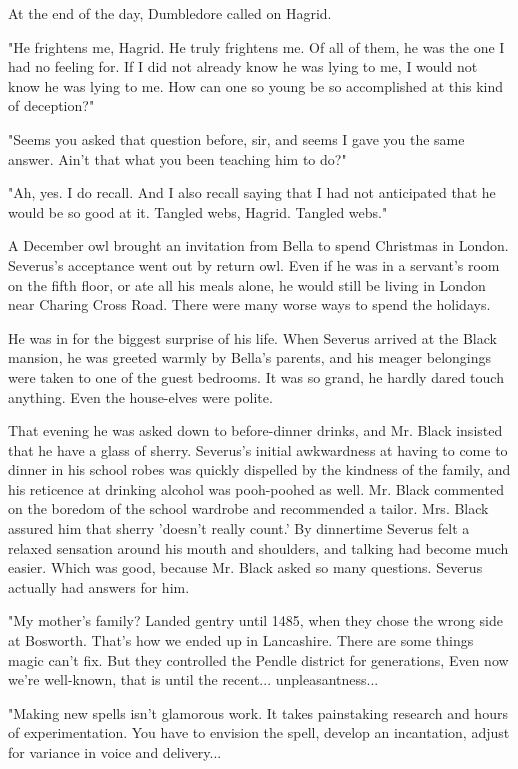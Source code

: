 \documentclass[a4paper,11pt]{article}
\begin{document}
At the end of the day, Dumbledore called on Hagrid.

"He frightens me, Hagrid. He truly frightens me. Of all of them, he was the one I had no feeling for. If I did not already know he was lying to me, I would not know he was lying to me. How can one so young be so accomplished at this kind of deception?"

"Seems you asked that question before, sir, and seems I gave you the same answer. Ain't that what you been teaching him to do?"

"Ah, yes. I do recall. And I also recall saying that I had not anticipated that he would be so good at it. Tangled webs, Hagrid. Tangled webs."

A December owl brought an invitation from Bella to spend Christmas in London. Severus's acceptance went out by return owl. Even if he was in a servant's room on the fifth floor, or ate all his meals alone, he would still be living in London near Charing Cross Road. There were many worse ways to spend the holidays.

He was in for the biggest surprise of his life. When Severus arrived at the Black mansion, he was greeted warmly by Bella's parents, and his meager belongings were taken to one of the guest bedrooms. It was so grand, he hardly dared touch anything. Even the house-elves were polite.

That evening he was asked down to before-dinner drinks, and Mr. Black insisted that he have a glass of sherry. Severus's initial awkwardness at having to come to dinner in his school robes was quickly dispelled by the kindness of the family, and his reticence at drinking alcohol was pooh-poohed as well. Mr. Black commented on the boredom of the school wardrobe and recommended a tailor. Mrs. Black assured him that sherry 'doesn't really count.' By dinnertime Severus felt a relaxed sensation around his mouth and shoulders, and talking had become much easier. Which was good, because Mr. Black asked so many questions. Severus actually had answers for him.

"My mother's family? Landed gentry until 1485, when they chose the wrong side at Bosworth. That's how we ended up in Lancashire. There are some things magic can't fix. But they controlled the Pendle district for generations, Even now we're well-known, that is until the recent... unpleasantness...

"Making new spells isn't glamorous work. It takes painstaking research and hours of experimentation. You have to envision the spell, develop an incantation, adjust for variance in voice and delivery...
\end{document}
